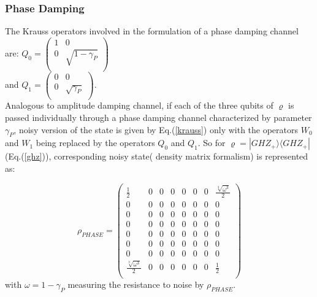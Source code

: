 \documentclass[pra,10pt,twocolumn,superscriptaddress,floatfix,showpacs]{revtex4-1}
\begin{document}
\subsubsection{Phase Damping}
The Krauss operators involved in the formulation of a phase damping channel are:
  $Q_0=\left(
              \begin{array}{cc}
                1 & 0 \\
                0 & \sqrt{1-\gamma_P} \\
              \end{array}
            \right)$\\
and $Q_1=\left(
              \begin{array}{cc}
                0 & 0 \\
                0 & \sqrt{\gamma_P} \\
              \end{array}
            \right)$.\\
Analogous to amplitude damping channel, if each of the three qubits of $\varrho$ is passed individually through a phase damping channel characterized by parameter $\gamma_P$, noisy version of the state is given by Eq.(\ref{krauss}) only with the operators $W_0$ and $W_1$ being replaced by the operators $Q_0$ and $Q_1$.
So for  $\varrho=|GHZ_+\rangle\langle GHZ_+|$(Eq.(\ref{ghz})), corresponding noisy state( density matrix formalism) is represented as:
 \begin{widetext}
\begin{equation}\label{pst12}
\rho_{PHASE}=\left(\begin{array}{cccccccc}
\frac{1}{2}&0&0&0&0&0 &0&\frac{\sqrt[3]{\omega^3}}{2}\\
0&0 & 0&0&0&0&0&0\\
0&0 &0&0&0&0&0&0\\
0&0&0&0&0&0&0&0\\
0&0&0&0&0&0&0&0\\
0&0&0&0&0&0&0&0\\
0 &0&0&0&0&0&0&0\\
\frac{\sqrt[3]{\omega^3}}{2}&0&0&0&0&0&0&\frac{1}{2}\\
\end{array} \right)
\end{equation}
with $\omega=1-\gamma_P$ measuring the resistance to noise by $\rho_{PHASE}.$
\end{widetext}
\end{document}
